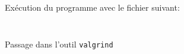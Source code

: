 Exécution du programme avec le fichier suivant:
\inputminted[frame=single,label=Test]{text}{../tests/test}

\inputminted[frame=single,label=Resultat]{text}{../tests/resultat_test}

\newpage
Passage dans l'outil \texttt{valgrind}
\inputminted[frame=single,label=Resultat Valgrind]{text}{../tests/valgrind_test}